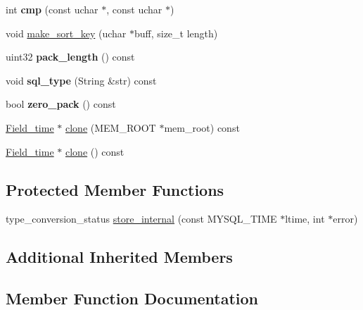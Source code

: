 \begin{DoxyCompactItemize}
int {\bfseries cmp} (const uchar $\ast$, const uchar $\ast$)
\item 
void \mbox{\hyperlink{classField__time_a212ddb3fed8f19fe72d2af7eb968fb06}{make\+\_\+sort\+\_\+key}} (uchar $\ast$buff, size\+\_\+t length)
\item 
\mbox{\label{classField__time_a538dfe82b08e8f364587d88e721429b1}} 
uint32 {\bfseries pack\+\_\+length} () const
\item 
\mbox{\label{classField__time_a698ba0733493805a247e8656a99811eb}} 
void {\bfseries sql\+\_\+type} (String \&str) const
\item 
\mbox{\label{classField__time_a5f67e846398b9d336fd129e7c2387629}} 
bool {\bfseries zero\+\_\+pack} () const
\item 
\mbox{\hyperlink{classField__time}{Field\+\_\+time}} $\ast$ \mbox{\hyperlink{classField__time_af750d34b75b3142fed105192f17943fe}{clone}} (M\+E\+M\+\_\+\+R\+O\+OT $\ast$mem\+\_\+root) const
\item 
\mbox{\hyperlink{classField__time}{Field\+\_\+time}} $\ast$ \mbox{\hyperlink{classField__time_a0def829c440ce9d2066056c865476d29}{clone}} () const
\end{DoxyCompactItemize}
\subsection*{Protected Member Functions}
\begin{DoxyCompactItemize}
\item 
type\+\_\+conversion\+\_\+status \mbox{\hyperlink{classField__time_a1589d404d2bc1d05aafc429e05f5308c}{store\+\_\+internal}} (const M\+Y\+S\+Q\+L\+\_\+\+T\+I\+ME $\ast$ltime, int $\ast$error)
\end{DoxyCompactItemize}
\subsection*{Additional Inherited Members}


\subsection{Member Function Documentation}
\mbox{\label{classField__time_af750d34b75b3142fed105192f17943fe}} 
